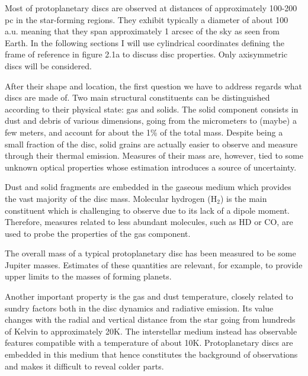 \documentclass[a4paper,10pt]{report}
\begin{document}

Most of protoplanetary discs are observed at distances of approximately 100-200 pc in the star-forming regions. 
They exhibit typically a diameter of about 100 a.u. meaning that they span approximately
1 arcsec of the sky as seen from Earth.
In the following sections I will use cylindrical coordinates 
defining the frame of reference in figure 2.1a to discuss disc properties. Only axisymmetric discs will be considered.

After their shape and location, the first question we have to address regards what discs are made of.
Two main structural constituents can be distinguished according to their physical state: gas and solids.
The solid component consists in dust and debris of various dimensions, going from the micrometers to (maybe) a few 
meters, and account for about the 1\% of the total mass. Despite being a small fraction of the disc, solid grains
are actually easier to observe and measure through their thermal emission. Measures of their mass are, however, tied to
some unknown optical properties whose estimation introduces a source of uncertainty.

Dust and solid fragments are embedded in the gaseous medium which provides the vast majority of the disc mass.
Molecular hydrogen (H$_2$) is the main constituent which is challenging to observe due to
its lack of a dipole moment. 
Therefore, measures related to less abundant molecules, such as HD or CO, are used to probe the properties of the gas component. 

The overall mass of a typical protoplanetary disc has been measured to be some Jupiter masses.
Estimates of these quantities are relevant, for example, to provide upper limits
to the masses of forming planets.

Another important property is the gas and dust temperature, closely related to sundry factors both in the disc dynamics and radiative emission.
Its value changes with the radial and vertical distance from the star going from hundreds of Kelvin to approximately 20K.
The interstellar medium instead has observable features compatible with a temperature of about 10K. Protoplanetary discs are embedded in this medium 
that hence constitutes the background of observations and makes it difficult to reveal colder parts.
\end{document}
